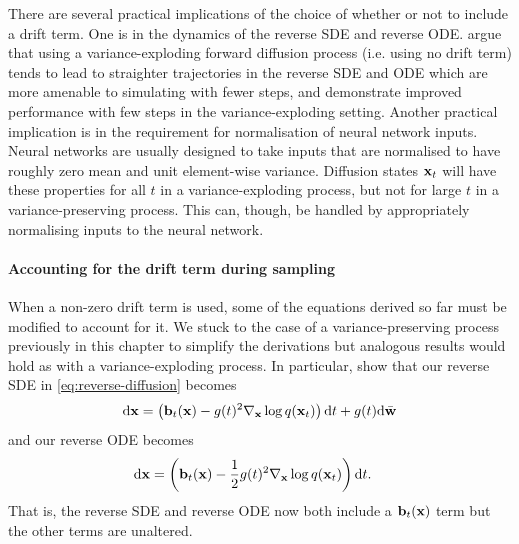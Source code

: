 There are several practical implications of the choice of whether or not to include a drift term. One is in the dynamics of the reverse SDE and reverse ODE. \citet{karras2022elucidating} argue that using a variance-exploding forward diffusion process (i.e. using no drift term) tends to lead to straighter trajectories in the reverse SDE and ODE which are more amenable to simulating with fewer steps, and demonstrate improved performance with few steps in the variance-exploding setting. Another practical implication is in the requirement for normalisation of neural network inputs. Neural networks are usually designed to take inputs that are normalised to have roughly zero mean and unit element-wise variance. Diffusion states ${\mathbf{x}}_t$ will have these properties for all $t$ in a variance-exploding process, but not for large $t$ in a variance-preserving process. This can, though, be handled by appropriately normalising inputs to the neural network.



\paragraph{Accounting for the drift term during sampling}
When a non-zero drift term is used, some of the equations derived so far must be modified to account for it. We stuck to the case of a variance-preserving process previously in this chapter to simplify the derivations but analogous results would hold as with a variance-exploding process. In particular, \citet{song2020score} show that our reverse SDE in \cref{eq:reverse-diffusion} becomes
\begin{equation} \label{eq:reverse-diffusion-with-drift}
    \mathrm{d}{\mathbf{x}} = \left( {\mathbf{b}}_t({\mathbf{x}}) - g(t)^2 \nabla_{\mathbf{x}} \log q({\mathbf{x}}_t) \right) \mathrm{d}t + g(t) \mathrm{d}\bar{{\mathbf{w}}}
\end{equation}
and our reverse ODE becomes
\begin{align}
    \mathrm{d}{\mathbf{x}} &= \left( {\mathbf{b}}_t({\mathbf{x}}) - \frac{1}{2} g(t)^2 \nabla_{\mathbf{x}} \log q({\mathbf{x}}_t) \right) \mathrm{d}t.
\end{align}
That is, the reverse SDE and reverse ODE now both include a ${\mathbf{b}}_t({\mathbf{x}})$ term but the other terms are unaltered.

